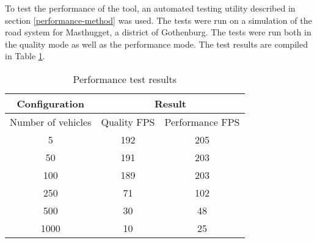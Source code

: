 To test the performance of the tool, an automated testing utility described in section \ref{performance-method} was used. The tests were run on a simulation of the road system for Masthugget, a district of Gothenburg. The tests were run both in the quality mode as well as the performance mode. The test results are compiled in Table \ref{Tab:performance-benchmark-results}.

\begin{table}[ht]
    \caption{Performance test results}
    \centering
    \begin{tabular}{|c|c|c|}
        \hline
        \multicolumn{1}{|c|}{Configuration} 
        &
        \multicolumn{2}{|c|}{Result}
        \\\hline
        Number of vehicles & Quality FPS & Performance FPS
        \\\hline
        
        5 & 192 & 205
        \\\hline
        50 & 191 & 203
        \\\hline
        100 & 189 & 203
        \\\hline
        250 & 71 & 102
        \\\hline
        500 & 30 & 48
        \\\hline
        1000 & 10 & 25
        
        \\\hline
    \end{tabular}
    \label{Tab:performance-benchmark-results}
\end{table}
